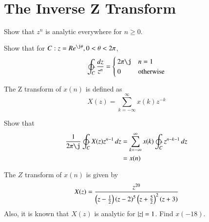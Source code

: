 \documentclass[journal,12pt,twocolumn]{IEEEtran}
\begin{document}
\section{The Inverse Z Transform}
\begin{problem}
Show that $z^{n}$ is analytic everywhere for $n \ge 0$.
\end{problem}
\begin{problem}
Show that for $C: z = Re^{\j\theta}, 0 < \theta < 2\pi$,
\begin{equation}
\ointctrclockwise_C \frac{dz}{z^n} =
\begin{cases}
2\pi \j & n = 1
\\ 
 0 & \text{otherwise}
\end{cases}
\end{equation}
\end{problem}
\begin{definition}
The Z transform of $x(n)$ is defined as
\begin{equation}
\label{eq:z_def}
X(z)=\sum _{k=-\infty }^{\infty }x(k)z^{-k}
\end{equation}
\end{definition}
\begin{problem}
Show that
\begin{align}
\frac{1}{2\pi\j}\ointctrclockwise_C X(z)z^{n-1}\,dz  &=\sum _{k=-\infty }^{\infty }x(k)\ointctrclockwise_C z^{n-k-1}\,dz
\\
&=x(n)
\end{align}
\end{problem}
\begin{problem}
The $Z$ transform of $x(n)$ is given by
\begin{equation}
X(z) = \frac{z^{20}}{\left(z-\frac{1}{2}\right)\left(z-2\right)^5\left(z+\frac{5}{2}\right)^2\left(z+3\right)}
\end{equation}
Also, it is known that $X(z)$ is analytic for $\left\vert z\right\vert = 1$. Find $x(-18)$.
\end{problem}
\end{document}
